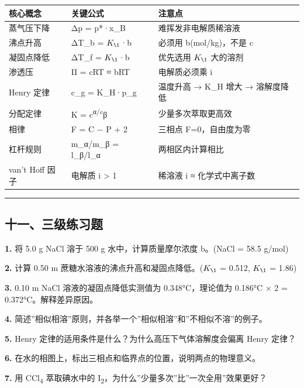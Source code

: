 {\def\LTcaptype{none} %
\begin{longtable}[]{@{}lll@{}}
\toprule\noalign{}
核心概念 & 关键公式 & 注意点 \\
\midrule\noalign{}
\endhead
\bottomrule\noalign{}
\endlastfoot
蒸气压下降 & Δp = p*·x\_B & 难挥发非电解质稀溶液 \\
沸点升高 & ΔT\_b = \(K_{\1}\)·b & 必须用 b(mol/kg)，不是 c \\
凝固点降低 & ΔT\_f = \(K_{\1}\)·b & 优先选用 \(K_{\1}\) 大的溶剂 \\
渗透压 & Π = cRT ≈ bRT & 电解质必须乘 i \\
Henry 定律 & c\_g = K\_H·p\_g & 温度升高 → K\_H 增大 → 溶解度降低 \\
分配定律 & K = c\textsuperscript{α/c}β & 少量多次萃取更高效 \\
相律 & F = C − P + 2 & 三相点 F=0，自由度为零 \\
杠杆规则 & m\_α/m\_β = l\_β/l\_α & 两相区内计算相比 \\
van't Hoff 因子 & 电解质 i \textgreater{} 1 & 稀溶液 i ≈ 化学式中离子数 \\
\end{longtable}
}

\begin{center}\rule{0.5\linewidth}{0.5pt}\end{center}

\subsection{十一、三级练习题}\label{ux5341ux4e00ux4e09ux7ea7ux7ec3ux4e60ux9898}

\textbf{1.} 将 5.0 g NaCl 溶于 500 g 水中，计算质量摩尔浓度 b。(NaCl = 58.5 g/mol)

\textbf{2.} 计算 0.50 m 蔗糖水溶液的沸点升高和凝固点降低。(\(K_{\1}\) = 0.512, \(K_{\1}\) = 1.86)

\textbf{3.} 0.10 m NaCl 溶液的凝固点降低实测值为 0.348°C，理论值为 0.186°C × 2 = 0.372°C。解释差异原因。

\textbf{4.} 简述''相似相溶''原则，并各举一个''相似相溶''和''不相似不溶''的例子。

\textbf{5.} Henry 定律的适用条件是什么？为什么高压下气体溶解度会偏离 Henry 定律？

\textbf{6.} 在水的相图上，标出三相点和临界点的位置，说明两点的物理意义。

\textbf{7.} 用 CCl\textsubscript{4} 萃取碘水中的 I\textsubscript{2}，为什么''少量多次''比''一次全用''效果更好？

